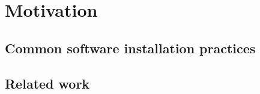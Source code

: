 
\section{Motivation}
\label{sec:motivation}

\subsection{Common software installation practices}

\subsection{Related work}

